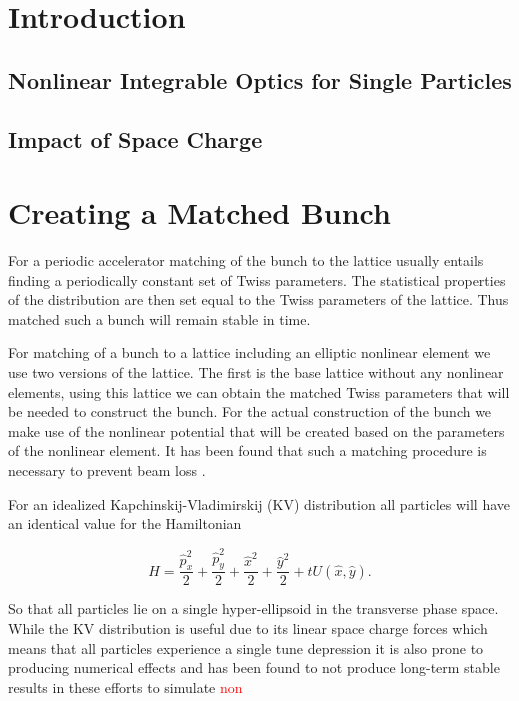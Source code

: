 \documentclass[aps,prstab,twocolumn, groupedaddress]{revtex4-1}
\begin{document}
\section{Introduction}
\subsection{Nonlinear Integrable Optics for Single Particles}
\subsection{Impact of Space Charge}

\section{Creating a Matched Bunch}
For a periodic accelerator matching of the bunch to the lattice usually entails finding a 
periodically constant set of Twiss parameters. The statistical properties of the distribution 
are then set equal to the Twiss parameters of the lattice. Thus matched such a bunch will 
remain stable in time.

For matching of a bunch to a lattice including an elliptic nonlinear element we use two 
versions of the lattice. The first is the base lattice without any nonlinear elements, using 
this lattice we can obtain the matched Twiss parameters that will be needed to construct 
the bunch. For the actual construction of the bunch we make use of the nonlinear 
potential that will be created based on the parameters of the nonlinear element. It has 
been found that such a matching procedure is necessary to prevent beam loss 
\cite{Webb:2015ton}. 

For an idealized  Kapchinskij-Vladimirskij (KV) distribution all particles will have an identical 
value for the Hamiltonian

	\begin{equation}
		H = \frac{\hat{p}^2_x}{2} +  \frac{\hat{p}^2_y}{2} +
		 \frac{\hat{x}^2}{2} + \frac{\hat{y}^2}{2} +
		 tU(\hat{x}, \hat{y}).
	\end{equation}

So that all particles lie on a single hyper-ellipsoid in the transverse phase space. While the 
KV distribution is useful due to its linear space charge forces which means that all 
particles experience a single tune depression
it is also prone to producing numerical effects and has been found to not produce 
long-term stable results in these efforts to simulate \textcolor{red}{non}
\end{document}
